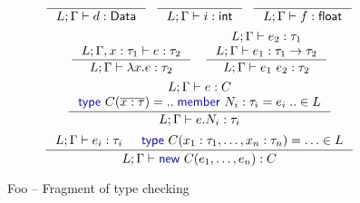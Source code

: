 \documentclass[10pt,preprint,blind,clearpagebib]{sigplanconf}
\newcommand{\kvd}[1]{\textnormal{\textcolor{kvdclr}{\sffamily #1}}}
\newcommand{\ident}[1]{\textnormal{\sffamily #1}}
\begin{document}

\begin{figure}
\noindent  
\begin{equation*}
\inference
  {~}
  {L; \Gamma \vdash d : \ident{Data}}
~~
\inference
  {~}
  {L; \Gamma \vdash i : \ident{int}}
~~
\inference
  {~}
  {L; \Gamma \vdash f : \ident{float}}
\end{equation*}
\vspace{0.25em}
\begin{equation*}
\inference
  {L; \Gamma, x : \tau_1 \vdash e : \tau_2}
  {L; \Gamma \vdash \lambda x.e : \tau_2}
\quad
\inference
  {L; \Gamma \vdash e_2 : \tau_1 \\
   L; \Gamma \vdash e_1 : \tau_1 \rightarrow \tau_2}
  {L; \Gamma \vdash e_1~e_2 : \tau_2}
\end{equation*}
\vspace{0.5em}
\begin{equation*}
\inference
  {L; \Gamma \vdash e : C \\ \kvd{type}~C(\overline{x:\tau}) = ..\;\kvd{member}~N_i : \tau_i = e_i\;.. \in L}
  {L; \Gamma \vdash e.N_i:\tau_i}
\end{equation*}
\vspace{0.25em}
\begin{equation*}
\inference
  {L; \Gamma \vdash e_i : \tau_i & \kvd{type}~C(x_1:\tau_1, \ldots, x_n:\tau_n) = \ldots \in L}
  {L; \Gamma \vdash \kvd{new}~C(e_1, \ldots, e_n):C}
\end{equation*}

\caption{Foo -- Fragment of type checking}
\label{fig:ff-typecheck}
\end{figure}

\end{document}
